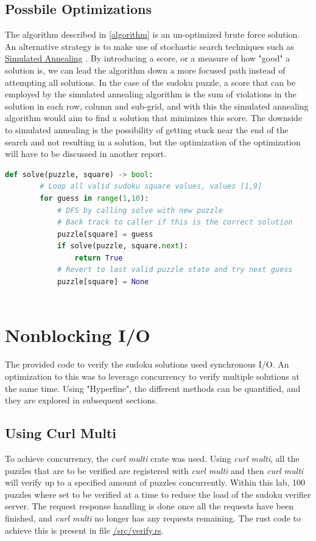 \documentclass[12pt]{article}
\begin{document}
\subsection{Possbile Optimizations}
The algorithm described in \ref*{algorithm} is an un-optimized brute force solution. An alternative strategy is to make use of stochastic search techniques such as \href{https://en.wikipedia.org/wiki/Simulated_annealing}{Simulated Annealing} . By introducing a score, or a measure of how "good" a solution is, we can lead the algorithm down a more focused path instead of attempting all solutions. In the case of the sudoku puzzle, a score that can be employed by the simulated annealing algorithm is the sum  of violations in the solution in each row, column and sub-grid, and with this the simulated annealing algorithm would aim to find a solution that minimizes this score. The downside to simulated annealing is the possibility of getting stuck near the end of the search and not resulting in a solution, but the optimization of the optimization will have to be discussed in another report.

\begin{lstlisting}[language=python, caption={Sudoku solver python pseudo code}, label={sudoku-solver-pseudo-code}]
    def solve(puzzle, square) -> bool:
        # Loop all valid sudoku square values, values [1,9]
        for guess in range(1,10):
            # DFS by calling solve with new puzzle
            # Back track to caller if this is the correct solution     
            puzzle[square] = guess
            if solve(puzzle, square.next):
                return True
            # Revert to last valid puzzle state and try next guess
            puzzle[square] = None
            
\end{lstlisting}

\section{Nonblocking I/O}
The provided code to verify the sudoku solutions used synchronous I/O. An optimization to this was to leverage concurrency to verify multiple solutions at the same time. Using "Hyperfine", the different methods can be quantified, and they are explored in subsequent sections.

\subsection{Using Curl Multi}
To achieve concurrency, the \textit{curl multi} crate was used. Using \textit{curl multi}, all the puzzles that are to be verified are registered with \textit{curl multi} and then \textit{curl multi} will verify up to a specified amount of puzzles concurrently. Within this lab, 100 puzzles where set to be verified at a time to reduce the load of the sudoku verifier server. The request response handling is done once all the requests have been finished, and \textit{curl multi} no longer has any requests remaining. The rust code to achieve this is present in file  \url{/src/verify.rs}.
\end{document}
